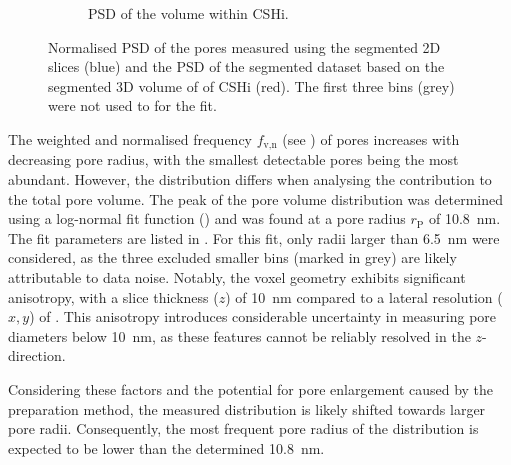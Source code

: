 \begin{figure}[H]
\begin{subfigure}[t]{0.49\textwidth}
		\caption{\ac{PSD} of the volume within \ac{CSHi}.}
		\label{fig:fib_highres_hist_3D-b}
	\end{subfigure}
	\caption{
		Normalised \ac{PSD} of the pores measured using the segmented 2D slices ({\color{blue}blue}) and the \ac{PSD} of the segmented dataset based on the segmented 3D volume of of \ac{CSHi} ({\color{red}red}).
		The first three bins ({\color{darkgrey}grey}) were not used to for the fit.
	}
	\label{fig:fib_highres_hist_3D}
\end{figure}


The weighted and normalised frequency $f_\text{v,n}$ (see ) of pores increases with decreasing pore radius, with the smallest detectable pores being the most abundant.
However, the distribution differs when analysing the contribution to the total pore volume.
The peak of the pore volume distribution was determined using a log-normal fit function () and was found at a pore radius $r_\text{P}$ of \qty{10.8}{\nano\meter}.
The fit parameters are listed in .
For this fit, only radii larger than \qty{6.5}{\nano\meter} were considered, as the three excluded smaller bins (marked in grey) are likely attributable to data noise.
Notably, the voxel geometry exhibits significant anisotropy, with a slice thickness ($z$) of \qty{10}{\nano\meter} compared to a lateral resolution ($x, y$) of .
This anisotropy introduces considerable uncertainty in measuring pore diameters below \qty{10}{\nano\meter}, as these features cannot be reliably resolved in the $z$-direction.

Considering these factors and the potential for pore enlargement caused by the preparation method, the measured distribution is likely shifted towards larger pore radii.
Consequently, the most frequent pore radius of the distribution is expected to be lower than the determined \qty{10.8}{\nano\meter}.

